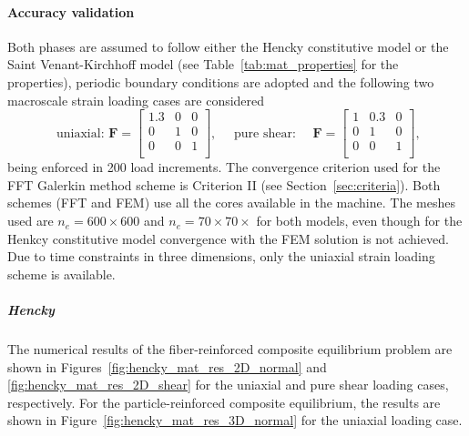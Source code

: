 \FloatBarrier

\paragraph{Accuracy validation}

Both phases are assumed to follow either the Hencky constitutive model or the Saint Venant-Kirchhoff model (see Table~\ref{tab:mat_properties} for the properties), periodic boundary conditions are adopted and the following two macroscale strain loading cases are considered
\begin{equation}
\text { uniaxial: } \bm{F}=\left[\begin{array}{ccc}
1.3 & 0 & 0 \\
0 & 1 & 0  \\
0 & 0 & 1  \\
\end{array}\right], \quad \text { pure shear: } \quad \bm F=\left[\begin{array}{ccc}
1 & 0.3 & 0 \\
0 & 1 & 0  \\
0 & 0 & 1  \\
\end{array}\right],
\end{equation}
being enforced in 200 load increments.
The convergence criterion used for the FFT Galerkin method scheme is Criterion II (see Section~\ref{sec:criteria}).
Both schemes (FFT and FEM) use all the cores available in the machine.
The meshes used are \(n_e=600\times 600\) and \(n_e = 70\times70\times\) for both models, even though for the Henkcy constitutive model convergence with the FEM solution is not achieved.
Due to time constraints in three dimensions, only the uniaxial strain loading scheme is available.

\subparagraph{Hencky}
\label{sec:hencky_accuracy_validation}

The numerical results of the fiber-reinforced composite equilibrium problem are shown in Figures~\ref{fig:hencky_mat_res_2D_normal} and \ref{fig:hencky_mat_res_2D_shear} for the uniaxial and pure shear loading cases, respectively.
For the particle-reinforced composite equilibrium, the results are shown in Figure~\ref{fig:hencky_mat_res_3D_normal} for the uniaxial loading case.

